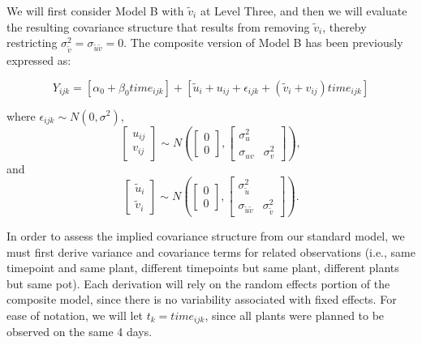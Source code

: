 \documentclass[
]{krantz}
\begin{document}
We will first consider Model B with \(\tilde{v}_{i}\) at Level Three, and then we will evaluate the resulting covariance structure that results from removing \(\tilde{v}_{i}\), thereby restricting \(\sigma_{\tilde{v}}^{2}=\sigma_{\tilde{u}\tilde{v}}=0\). The composite version of Model B has been previously expressed as:

\begin{equation}
Y_{ijk}=[\alpha_{0}+\beta_{0}\textstyle{time}_{ijk}]+
[\tilde{u}_{i}+u_{ij}+\epsilon_{ijk}+(\tilde{v}_{i}+v_{ij})\textstyle{time}_{ijk}]
\label{eq:modbcomp}
\end{equation}

where \(\epsilon_{ijk}\sim N(0,\sigma^2)\),
\[ \left[ \begin{array}{c}
            u_{ij} \\ v_{ij}
          \end{array}  \right] \sim N \left( \left[
          \begin{array}{c}
            0 \\ 0
          \end{array} \right], \left[
          \begin{array}{cc}
            \sigma_{u}^{2} & \\
            \sigma_{uv} & \sigma_{v}^{2}
          \end{array} \right] \right), \] and
\[ \left[ \begin{array}{c}
            \tilde{u}_{i} \\ \tilde{v}_{i}
          \end{array}  \right] \sim N \left( \left[
          \begin{array}{c}
            0 \\ 0
          \end{array} \right], \left[
          \begin{array}{cc}
            \sigma_{\tilde{u}}^{2} & \\
            \sigma_{\tilde{u}\tilde{v}} & \sigma_{\tilde{v}}^{2}
          \end{array} \right] \right). \]

In order to assess the implied covariance structure from our standard model, we must first derive variance and covariance terms for related observations (i.e., same timepoint and same plant, different timepoints but same plant, different plants but same pot). Each derivation will rely on the random effects portion of the composite model, since there is no variability associated with fixed effects. For ease of notation, we will let \(t_{k}=\textstyle{time}_{ijk}\), since all plants were planned to be observed on the same 4 days.
\end{document}
